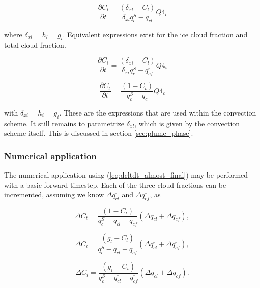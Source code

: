 \documentclass{UMDP_article}
\begin{document}
\begin{equation}
\frac{\partial{C_l}}{\partial{t}} =
\frac{ (\delta_{xl} - C_l) }{ \delta_{xl} q_{c}^S - \overline{q_{cl}} }
Q4_l 
\label{eq:dctdt_xl}
\end{equation}

where $\delta_{xl} = h_l = g_l$. Equivalent expressions exist for the
ice cloud fraction and total cloud fraction.

\begin{equation}
\frac{\partial{C_i}}{\partial{t}} =
\frac{ (\delta_{xi} - C_l) }{ \delta_{xi} q_{c}^S - \overline{q_{cf}} }
Q4_i 
\label{eq:dctdt_xi}
\end{equation}

\begin{equation}
\frac{\partial{C_t}}{\partial{t}} =
\frac{ (1 - C_t) }{ q_{c}^S - \overline{q_{c}} } Q4_c
\label{eq:dctdt_xc}
\end{equation}

with $\delta_{xi} = h_i = g_i$. These are the expressions that are used
within the convection scheme. It still remains to parametrize $\delta_{xl}$,
which is given by the convection scheme itself. This is discussed in
section \ref{sec:plume_phase}.

\subsubsection{Numerical application}
\label{sec:multi_numapp}
The numerical application using (\ref{eq:dcltdt_almost_final}) may be performed
with a basic forward timestep. Each of the three cloud fractions can
be incremented, assuming we know $\Delta{\overline{q_{cl}}}$ and
$\Delta{\overline{q_{cf}}}$, as

\begin{equation}
\Delta{C_t} = \frac{(1 - C_t)} {q_c^S - \overline{q_{cl}} - \overline{q_{cf}}}
( \Delta{\overline{q_{cl}}} + \Delta{\overline{q_{cf}}} ), 
\label{eq:cft_ts}
\end{equation}

\begin{equation}
\Delta{C_l} = \frac{ (g_l - C_l)}
{q_c^S - \overline{q_{cl}} - \overline{q_{cf}}}
( \Delta{\overline{q_{cl}}} + \Delta{\overline{q_{cf}}} ),
\label{eq:cfl_ts}
\end{equation}

\begin{equation}
\Delta{C_i} = \frac{ (g_i - C_i)} 
{q_c^S - \overline{q_{cl}} - \overline{q_{cf}}}
( \Delta{\overline{q_{cl}}} + \Delta{\overline{q_{cf}}} ).
\label{eq:cff_ts}
\end{equation}
\end{document}
